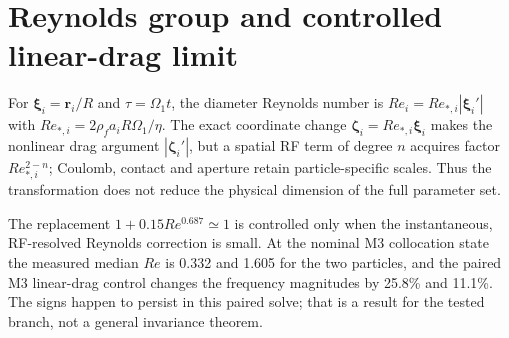 \section{Reynolds group and controlled linear-drag limit}
For $\boldsymbol\xi_i=\mathbf r_i/R$ and $\tau=\Omega_1t$, the diameter Reynolds number is $Re_i=Re_{*,i}|\boldsymbol\xi_i'|$ with $Re_{*,i}=2\rho_fa_iR\Omega_1/\eta$. The exact coordinate change $\boldsymbol\zeta_i=Re_{*,i}\boldsymbol\xi_i$ makes the nonlinear drag argument $|\boldsymbol\zeta_i'|$, but a spatial RF term of degree $n$ acquires factor $Re_{*,i}^{2-n}$; Coulomb, contact and aperture retain particle-specific scales. Thus the transformation does not reduce the physical dimension of the full parameter set.

The replacement $1+0.15Re^{0.687}\simeq1$ is controlled only when the instantaneous, RF-resolved Reynolds correction is small. At the nominal M3 collocation state the measured median $Re$ is 0.332 and 1.605 for the two particles, and the paired M3 linear-drag control changes the frequency magnitudes by 25.8\% and 11.1\%. The signs happen to persist in this paired solve; that is a result for the tested branch, not a general invariance theorem.
